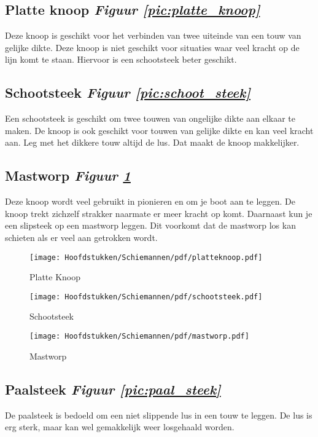 \subsection{Platte knoop \hfill \textit{Figuur \ref{pic:platte_knoop}}}
Deze knoop is geschikt voor het verbinden van twee uiteinde van een touw van gelijke dikte. Deze knoop is niet geschikt voor situaties waar veel kracht op de lijn komt te staan. Hiervoor is een schootsteek beter geschikt.
\subsection{Schootsteek \hfill \textit{Figuur \ref{pic:schoot_steek}}}
Een schootsteek is geschikt om twee touwen van ongelijke dikte aan elkaar te maken. De knoop is ook geschikt voor touwen van gelijke dikte en kan veel kracht aan. Leg met het dikkere touw altijd de lus. Dat maakt de knoop makkelijker. 
\subsection{Mastworp \hfill \textit{Figuur \ref{pic:mastworp}}}
Deze knoop wordt veel gebruikt in pionieren en om je boot aan te leggen. De knoop trekt zichzelf strakker naarmate er meer kracht op komt. Daarnaast kun je een slipsteek op een mastworp leggen. Dit voorkomt dat de mastworp los kan schieten als er veel aan getrokken wordt. 
\begin{figure}[h]
  \centering
  \begin{minipage}[b]{0.32\textwidth}
  \centering
    \texttt{[image: Hoofdstukken/Schiemannen/pdf/platteknoop.pdf]}
    \caption{Platte Knoop}
    \label{pic:platte_knoop}
  \end{minipage}
  \hfill
  \begin{minipage}[b]{0.32\textwidth}
    \centering
    \texttt{[image: Hoofdstukken/Schiemannen/pdf/schootsteek.pdf]}
    \caption{Schootsteek}
    \label{pic:schoot_steek}
    \end{minipage}
  \hfill
  \begin{minipage}[b]{0.32\textwidth}
    \centering
    \texttt{[image: Hoofdstukken/Schiemannen/pdf/mastworp.pdf]}
    \caption{Mastworp}
    \label{pic:mastworp}
  \end{minipage}
\end{figure}
\subsection{Paalsteek \hfill \textit{Figuur \ref{pic:paal_steek}}} 
De paalsteek is bedoeld om een niet slippende lus in een touw te leggen. De lus is erg sterk, maar kan wel gemakkelijk weer losgehaald worden.
